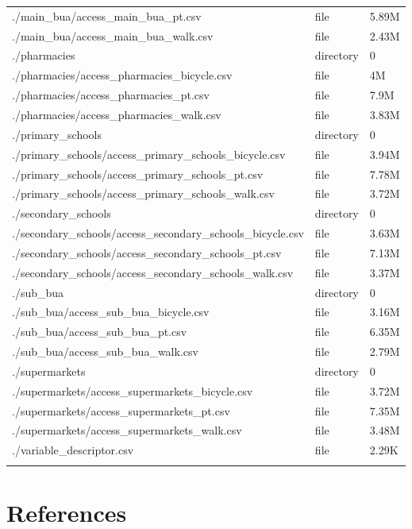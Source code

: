 \documentclass{article}
\begin{document}
\begin{longtable}[t]{>{\raggedright\arraybackslash}p{13cm}ll}
./main\_bua/access\_main\_bua\_pt.csv & file & 5.89M\\
./main\_bua/access\_main\_bua\_walk.csv & file & 2.43M\\
./pharmacies & directory & 0\\
\addlinespace
./pharmacies/access\_pharmacies\_bicycle.csv & file & 4M\\
./pharmacies/access\_pharmacies\_pt.csv & file & 7.9M\\
./pharmacies/access\_pharmacies\_walk.csv & file & 3.83M\\
./primary\_schools & directory & 0\\
./primary\_schools/access\_primary\_schools\_bicycle.csv & file & 3.94M\\
\addlinespace
./primary\_schools/access\_primary\_schools\_pt.csv & file & 7.78M\\
./primary\_schools/access\_primary\_schools\_walk.csv & file & 3.72M\\
./secondary\_schools & directory & 0\\
./secondary\_schools/access\_secondary\_schools\_bicycle.csv & file & 3.63M\\
./secondary\_schools/access\_secondary\_schools\_pt.csv & file & 7.13M\\
\addlinespace
./secondary\_schools/access\_secondary\_schools\_walk.csv & file & 3.37M\\
./sub\_bua & directory & 0\\
./sub\_bua/access\_sub\_bua\_bicycle.csv & file & 3.16M\\
./sub\_bua/access\_sub\_bua\_pt.csv & file & 6.35M\\
./sub\_bua/access\_sub\_bua\_walk.csv & file & 2.79M\\
\addlinespace
./supermarkets & directory & 0\\
./supermarkets/access\_supermarkets\_bicycle.csv & file & 3.72M\\
./supermarkets/access\_supermarkets\_pt.csv & file & 7.35M\\
./supermarkets/access\_supermarkets\_walk.csv & file & 3.48M\\
./variable\_descriptor.csv & file & 2.29K\\*
\end{longtable}
\endgroup{}

\hypertarget{references}{%
\section*{References}\label{references}}
\end{document}
